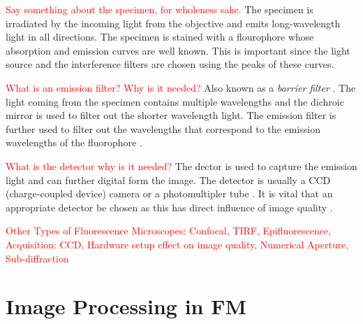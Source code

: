 \begin{definition}[Specimen]
	\textcolor{red}{Say something about the specimen, for wholeness sake.}
	The specimen is irradiated by the incoming light from the objective and emits long-wavelength light in all directions.
	The specimen is stained with a flourophore whose absorption and emission curves are well known.
	This is important since the light source and the interference filters are chosen using the peaks of these curves.
\end{definition}

\begin{definition}
	\textcolor{red}{What is an emission filter? Why is it needed?}
	Also known as a \textit{barrier filter} \citep{LichtmanConchello2005,Spring2003,Koch1972}.
	The light coming from the specimen contains multiple wavelengths and the dichroic mirror is used to filter out the shorter wavelength light.
	The emission filter is further  used to filter out the wavelengths that correspond to the emission wavelengths of the fluorophore \citep{CudeBurke2014,Danek2012,Hubeny2008,SpringDavisdson2016,ThermoFisher2016}.
\end{definition}


\begin{definition}[Detector]
	\textcolor{red}{What is the detector why is it needed?}
	The dector is used to capture the emission light and can further digital form the image.
	The detector is usually a CCD (charge-coupled device) camera or a photomultipler tube \citep{Danek2012,Hubeny2008,LichtmanConchello2005,Spring2003,Murphy2001}.
	It is vital that an appropriate detector be chosen as this has direct influence of image quality \citep{Fatima2008}.
\end{definition}

\textcolor{red}{Other Types of Fluorescence Microscopes: Confocal, TIRF, Epifluorescence, Acquisition: CCD, Hardware setup effect on image quality, Numerical Aperture, Sub-diffraction}



\section{Image Processing in FM}
\label{sec:ImageProcessingInFM}


